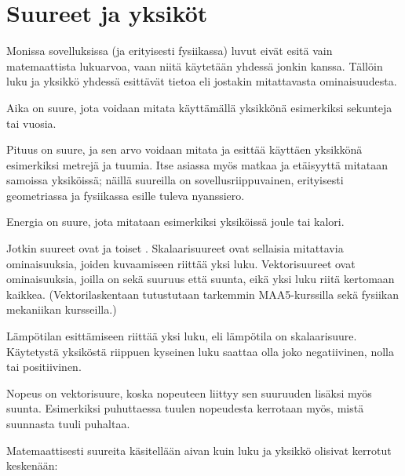  \section*{Suureet ja yksiköt}

Monissa sovelluksissa (ja erityisesti fysiikassa) luvut eivät esitä vain matemaattista lukuarvoa, vaan niitä käytetään yhdessä jonkin  kanssa. Tällöin luku ja yksikkö yhdessä esittävät tietoa  eli jostakin mitattavasta ominaisuudesta.

\begin{esimerkki}

Aika on suure, jota voidaan mitata käyttämällä yksikkönä esimerkiksi sekunteja tai vuosia.

Pituus on suure, ja sen arvo voidaan mitata ja esittää käyttäen yksikkönä esimerkiksi metrejä ja tuumia. Itse asiassa myös matkaa ja etäisyyttä mitataan samoissa yksiköissä; näillä suureilla on sovellusriippuvainen, erityisesti geometriassa ja fysiikassa esille tuleva nyanssiero.

Energia on suure, jota mitataan esimerkiksi yksiköissä joule tai kalori.
\end{esimerkki}

Jotkin suureet ovat  ja toiset . Skalaarisuureet ovat sellaisia mitattavia ominaisuuksia, joiden kuvaamiseen riittää yksi luku. Vektorisuureet ovat ominaisuuksia, joilla on sekä suuruus että suunta, eikä yksi luku riitä kertomaan kaikkea. (Vektorilaskentaan tutustutaan tarkemmin MAA5-kurssilla sekä fysiikan mekaniikan kursseilla.)

\begin{esimerkki}
Lämpötilan esittämiseen riittää yksi luku, eli lämpötila on skalaarisuure. Käytetystä yksiköstä riippuen kyseinen luku saattaa olla joko negatiivinen, nolla tai positiivinen.

Nopeus on vektorisuure, koska nopeuteen liittyy sen suuruuden lisäksi myös suunta. Esimerkiksi puhuttaessa tuulen nopeudesta kerrotaan myös, mistä suunnasta tuuli puhaltaa.
\end{esimerkki}

Matemaattisesti suureita käsitellään aivan kuin luku ja yksikkö olisivat kerrotut keskenään:

